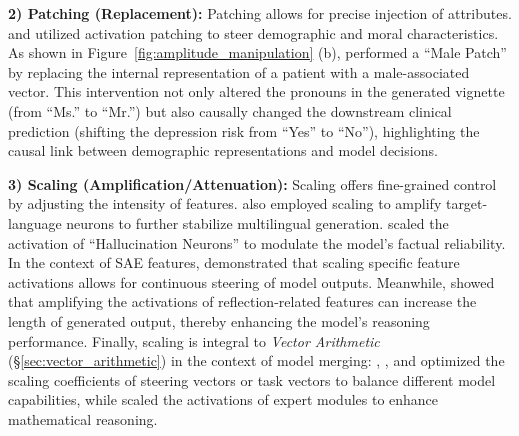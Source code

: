 \documentclass[11pt,letterpaper]{mystyle}
\begin{document}
\textbf{2) Patching (Replacement):}
Patching allows for precise injection of attributes. \citet{ahsanElucidatingMechanismsDemographic2025} and \citet{raimondiAnalysingMoralBias2025} utilized activation patching to steer demographic and moral characteristics. As shown in Figure~\ref{fig:amplitude_manipulation} (b), \citet{ahsanElucidatingMechanismsDemographic2025} performed a ``Male Patch'' by replacing the internal representation of a patient with a male-associated vector. This intervention not only altered the pronouns in the generated vignette (from ``Ms.'' to ``Mr.'') but also causally changed the downstream clinical prediction (shifting the depression risk from ``Yes'' to ``No''), highlighting the causal link between demographic representations and model decisions.

\textbf{3) Scaling (Amplification/Attenuation):}
Scaling offers fine-grained control by adjusting the intensity of features.
\citet{tang-etal-2024-language} also employed scaling to amplify target-language neurons to further stabilize multilingual generation.
\citet{gao2025hneuronsexistenceimpactorigin} scaled the activation of ``Hallucination Neurons'' to modulate the model's factual reliability.
In the context of SAE features, \citet{pach2025sparse} demonstrated that scaling specific feature activations allows for continuous steering of model outputs. 
Meanwhile, \citet{galichin2025have} showed that amplifying the activations of reflection-related features can increase the length of generated output, thereby enhancing the model’s reasoning performance.
Finally, scaling is integral to \textit{Vector Arithmetic} (\S\ref{sec:vector_arithmetic}) in the context of model merging: \citet{stoehr-etal-2024-activation}, \citet{liu2025sensmerging}, and \citet{yao2025activation} optimized the scaling coefficients of steering vectors or task vectors to balance different model capabilities, while \citet{wang2025two} scaled the activations of expert modules to enhance mathematical reasoning.
\end{document}
